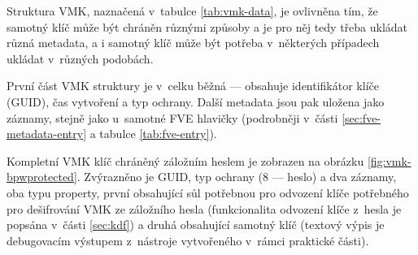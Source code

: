 Struktura VMK, naznačená v~tabulce \ref{tab:vmk-data}, je ovlivněna tím, že samotný klíč může být chráněn různými způsoby a je pro něj tedy třeba ukládat různá metadata, a i samotný klíč může být potřeba v~některých případech ukládat v~různých podobách.

První část VMK struktury je v~celku běžná --- obsahuje identifikátor klíče (GUID), čas vytvoření a typ ochrany. Další metadata jsou pak uložena jako záznamy, stejně jako u~samotné FVE hlavičky (podrobněji v~části \ref{sec:fve-metadata-entry} a tabulce \ref{tab:fve-entry}).


Kompletní VMK klíč chráněný záložním heslem je zobrazen na obrázku \ref{fig:vmk-bpwprotected}. Zvý\-raz\-ně\-no je GUID, typ ochrany (8 --- heslo) a dva  záznamy, oba typu property, první obsahující sůl potřebnou pro odvození klíče potřebného pro dešifrování VMK ze záložního hesla (funkcionalita odvození klíče z~hesla je popsána v~části \ref{sec:kdf}) a druhá obsahující samotný klíč (textový výpis je debugovacím výstupem z~nástroje vytvořeného v~rámci praktické části).


